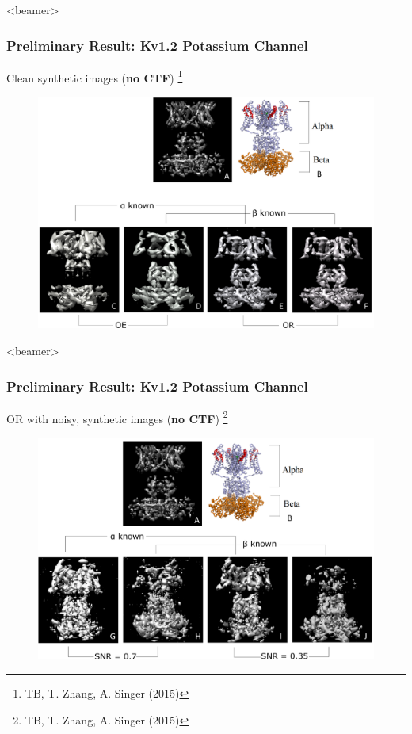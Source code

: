 \documentclass{beamer}
\newcommand\blfootnote[1]{%
  \begingroup
  \renewcommand\thefootnote{}\footnote{#1}%
  \addtocounter{footnote}{-1}%
  \endgroup
}
\begin{document}
\begin{frame}<beamer>
\frametitle{Preliminary Result: Kv1.2 Potassium Channel}
Clean synthetic images (\textbf{no CTF}) \blfootnote{TB, T. Zhang, A. Singer (2015)}
\begin{figure}[!htbp]
\begin{center}
\includegraphics[width=.65 \columnwidth]{figures/reconstruction_all_clean.pdf}
\end{center}
\end{figure}
\end{frame}

\begin{frame}<beamer>
\frametitle{Preliminary Result: Kv1.2 Potassium Channel}
OR with noisy, synthetic images (\textbf{no CTF}) \blfootnote{TB, T. Zhang, A. Singer (2015)}
\begin{figure}[!htbp]
\begin{center}
\includegraphics[width=.65 \columnwidth]{figures/reconstruction_all_noisy.pdf}
\end{center}
\end{figure}
\end{frame}
\end{document}
